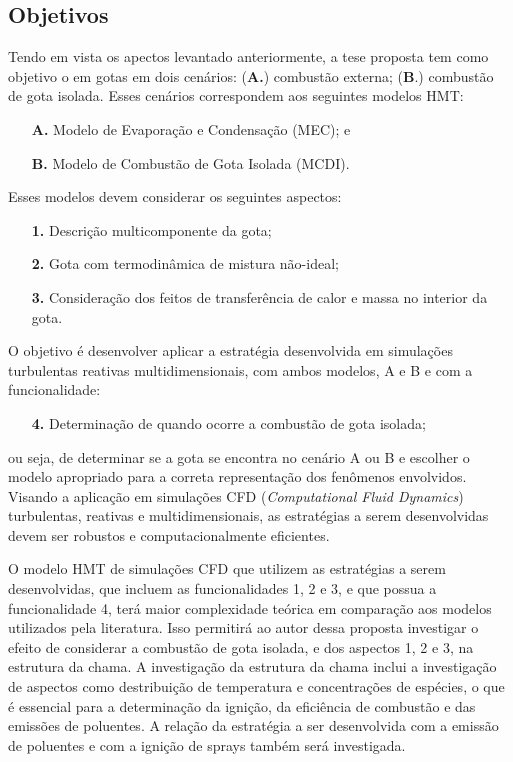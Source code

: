 \subsection{Objetivos} \label{sec:objetivos}

Tendo em vista os apectos levantado anteriormente, a tese proposta tem como objetivo o  em gotas em dois cenários: (\textbf{A.}) combustão externa; (\textbf{B}.) combustão de gota isolada.
Esses cenários correspondem aos seguintes modelos HMT:
\begin{enumerate}
    \item[\textbf{A.}] Modelo de Evaporação e Condensação (MEC); e 
    \item[\textbf{B.}] Modelo de Combustão de Gota Isolada (MCDI).
\end{enumerate}
Esses modelos devem considerar os seguintes aspectos: 
\begin{enumerate}
    \item[\textbf{1.}] Descrição multicomponente da gota; 
    \item[\textbf{2.}] Gota com termodinâmica de mistura não-ideal; 
    \item[\textbf{3.}] Consideração dos feitos de transferência	de calor e massa no interior da gota. 
\end{enumerate}
O objetivo é desenvolver aplicar a estratégia desenvolvida em simulações turbulentas reativas multidimensionais, com ambos modelos, {A} e {B} e com a funcionalidade:
\begin{enumerate}
    \item[\textbf{4.}] Determinação de quando ocorre a combustão de gota isolada;
\end{enumerate}
ou seja, de determinar se a gota se encontra no cenário {A} ou {B} e escolher o modelo apropriado para a correta representação dos fenômenos envolvidos.
Visando a aplicação em simulações CFD (\emph{Computational Fluid Dynamics}) turbulentas, reativas e multidimensionais, as estratégias a serem desenvolvidas devem ser robustos e computacionalmente eficientes.

O modelo HMT de simulações CFD que utilizem as estratégias a serem desenvolvidas, que incluem as funcionalidades {1}, {2} e {3}, e que possua a funcionalidade {4}, terá maior complexidade teórica em comparação aos modelos utilizados pela literatura. 
Isso permitirá ao autor dessa proposta investigar o efeito de considerar a combustão de gota isolada, e dos aspectos {1}, {2} e {3}, na estrutura da chama.
A investigação da estrutura da chama inclui a investigação de aspectos como destribuição de temperatura e concentrações de espécies, o que é essencial para a determinação da ignição, da eficiência de combustão e das emissões de poluentes.
A relação da estratégia a ser desenvolvida com a emissão de poluentes e com a ignição de sprays também será investigada. 


